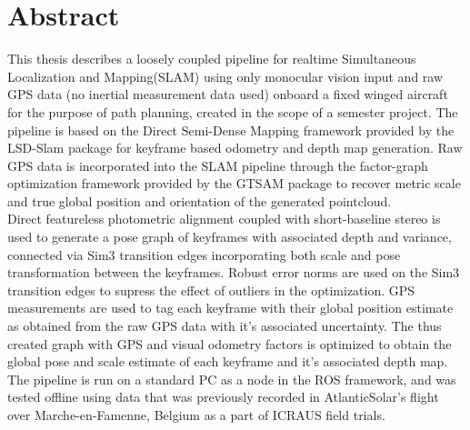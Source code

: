 \chapter*{Abstract}

This thesis describes a loosely coupled pipeline for realtime Simultaneous Localization and Mapping(SLAM) using only monocular vision input and raw GPS data (no inertial measurement data used) onboard a fixed winged aircraft for the purpose of path planning, created in the scope of a semester project. The pipeline is based on the Direct Semi-Dense Mapping framework provided by the LSD-Slam package for keyframe based odometry and depth map generation. Raw GPS data is incorporated into the SLAM pipeline through the factor-graph optimization framework provided by the GTSAM package to recover metric scale and true global position and orientation of the generated pointcloud. \\
Direct featureless photometric alignment coupled with short-baseline stereo is used to generate a pose graph of keyframes with associated depth and variance, connected via Sim3 transition edges incorporating both scale and pose transformation between the keyframes. Robust error norms are used on the Sim3 transition edges to supress the effect of outliers in the optimization. GPS measurements are used to tag each keyframe with their global position estimate as obtained from the raw GPS data with it's associated uncertainty. The thus created graph with GPS and visual odometry factors is optimized to obtain the global pose and scale estimate of each keyframe and it's associated depth map.\\
The pipeline is run on a standard PC as a node in the ROS framework, and was tested offline using data that was previously recorded in AtlanticSolar’s flight over Marche-en-Famenne, Belgium as a part of ICRAUS field trials.